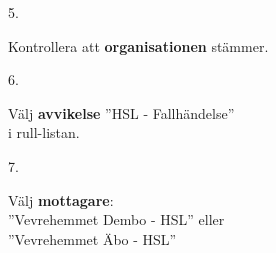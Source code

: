 \documentclass[paper=a5,DIV=15,headinclude,twoside=semi,openany,titlepage=firstiscover]{scrbook}
\begin{document}
\noindent\hrulefill

\vfill
\noindent
\begin{minipage}[t]{0.06\textwidth}
	\phantom{1}5.
\end{minipage}%
\begin{minipage}[t]{.44\textwidth}
	Kontrollera att \textbf{organisationen} stämmer.
\end{minipage}%
\begin{minipage}[t]{.5\textwidth}
	\hfill{}
\end{minipage}
\vfill

\noindent\hrulefill

\vfill
\noindent
\begin{minipage}[t]{0.06\textwidth}
	\phantom{1}6.
\end{minipage}%
\begin{minipage}[t]{.54\textwidth}
	Välj \textbf{avvikelse} ”HSL - Fallhändelse”\\
	i rull-listan.
\end{minipage}%
\begin{minipage}[t]{.4\textwidth}
	\hfill{}
\end{minipage}
\vfill

\noindent\hrulefill

\vfill
\noindent
\begin{minipage}[t]{0.06\textwidth}
	\phantom{1}7.
\end{minipage}%
\begin{minipage}[t]{.54\textwidth}
	Välj \textbf{mottagare}:\\ 
	”Vevrehemmet Dembo - HSL” eller\\”Vevrehemmet Äbo - HSL”
\end{minipage}%
\begin{minipage}[t]{.4\textwidth}
	\hfill{}
\end{minipage}
\vfill
\end{document}

